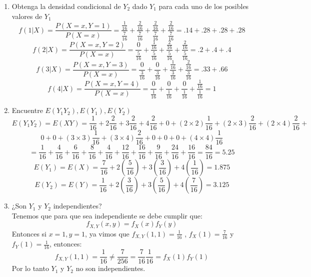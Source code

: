 \documentclass[11pt,a4paper]{report}
\begin{document}
\begin{enumerate}
{\begin{enumerate}
		
		        \item{Obtenga la densidad condicional de $Y_{2}$ dado $Y_{1}$ para cada uno de los posibles valores de $Y_{1}$}
		        \[ f(1|X) =\frac{P(X = x, Y = 1)}{P(X = x)} =
		        \frac{\frac{1}{16}}{\frac{7}{16}} + 
		        \frac{\frac{2}{16}}{\frac{7}{16}} +
		        \frac{\frac{2}{16}}{\frac{7}{16}} +
		        \frac{\frac{2}{16}}{\frac{7}{16}} =
		        .14 + .28 + .28 + .28\]
		        \[ f(2|X) =\frac{P(X = x, Y = 2)}{P(X = x)} =
		        \frac{0}{\frac{5}{16}} + 
		        \frac{\frac{1}{16}}{\frac{5}{16}} +
		        \frac{\frac{2}{16}}{\frac{5}{16}} +
		        \frac{\frac{2}{16}}{\frac{5}{16}} = 
		        .2 + .4 + .4\]
		        \[ f(3|X) =\frac{P(X = x, Y = 3)}{P(X = x)} =
		        \frac{0}{\frac{3}{16}} + 
		        \frac{0}{\frac{3}{16}} +
		        \frac{\frac{1}{16}}{\frac{3}{16}} +
		        \frac{\frac{2}{16}}{\frac{3}{16}} = 
		        .33 + .66\]
		        \[ f(4|X) =\frac{P(X = x, Y = 4)}{P(X = x)} =
		        \frac{0}{\frac{1}{16}} + 
		        \frac{0}{\frac{1}{16}} +
		        \frac{0}{\frac{1}{16}} +
		        \frac{\frac{1}{16}}{\frac{1}{16}} = 1\]
		        \item{Encuentre $E(Y_{1}Y_{2}),E(Y_{1}),E(Y_{2})$}\\
		        \[E(Y_{1}Y_{2}) = E(XY) =
		        \frac{1}{16} + 2\frac{2}{16} +3\frac{2}{16} +4\frac{2}{16} + 
		       0 + (2\times2)\frac{1}{16} + (2\times3)\frac{2}{16} + (2\times4)\frac{2}{16} +\]
		        \[0 + 0 + (3\times3)\frac{1}{16} + (3\times4)\frac{2}{16} + 0 + 0 + 0 + (4\times4)\frac{1}{16}\]
		        \[= \frac{1}{16} + \frac{4}{16} + \frac{6}{16} + \frac{8}{16} + \frac{4}{16} + \frac{12}{16} + \frac{16}{16} +
			\frac{9}{16} + \frac{24}{16} + \frac{16}{16} = \frac{84}{16} = 5.25\]
		        \[E(Y_1) = E(X) = \frac{7}{16} + 2(\frac{5}{16}) + 3(\frac{3}{16}) + 4(\frac{1}{16}) = 1.875\]
		        \[E(Y_2) = E(Y) = \frac{1}{16} + 2(\frac{3}{16}) + 3(\frac{5}{16}) + 4(\frac{7}{16}) = 3.125\]
		        
		        \item{¿Son $Y_{1} $ y $Y_{2}$ independientes?}\\
		        Tenemos que para que sea independiente se debe cumplir que:
		        \[f_{X,Y}(x,y) = f_X(x)f_Y(y)\]
		        Entonces si $x=1,y=1$, ya vimos que $f_{X,Y}(1,1) = \frac{1}{16}$ , $f_X(1) = \frac{7}{16}$ y $f_Y(1) = 
			\frac{1}{16}$, entonces:
		         \[f_{X,Y}(1,1) = \frac{1}{16} \neq \frac{7}{256} = \frac{7}{16}\frac{1}{16} = f_X(1)f_Y(1)\]
		         Por lo tanto $Y_1$ y $Y_2$ no son independientes.
		        

\end{enumerate}}
\end{enumerate}
\end{document}
